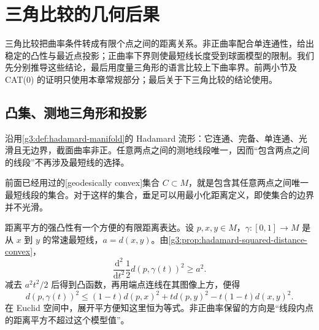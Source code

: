 
% 
% 
% 

\section{三角比较的几何后果}
\label{g3:sec:0904}

三角比较把曲率条件转成有限个点之间的距离关系。非正曲率配合单连通性，给出稳定的凸性与最近点投影；正曲率下界则使最短线长度受到球面模型的限制。我们先分别推导这些结论，最后用度量三角形的语言比较上下曲率界。前两小节及 CAT(0) 的证明只使用本章常规部分；最后关于下三角比较的结论使用。

\subsection{凸集、测地三角形和投影}
\label{g3:subsec:0904:01}

沿用\cref{g3:def:hadamard-manifold}的 Hadamard 流形：它连通、完备、单连通、光滑且无边界，截面曲率非正。任意两点之间的测地线段唯一，因而“包含两点之间的线段”不再涉及最短线的选择。

前面已经用过的[geodesically convex]集合 \(C\subset M\)，就是包含其任意两点之间唯一最短线段的集合。对于这样的集合，垂足可以用最小化距离定义，即使集合的边界并不光滑。

距离平方的强凸性有一个方便的有限距离表达。设 \(p,x,y\in M\)，\(\gamma:[0,1]\to M\) 是从 \(x\) 到 \(y\) 的常速最短线，\(a=d(x,y)\)。由\cref{g3:prop:hadamard-squared-distance-convex}，
\[
	\frac{\mathrm d^2}{\mathrm dt^2}\frac12d(p,\gamma(t))^2
	\ge a^2.
\]
减去 \(a^2t^2/2\) 后得到凸函数，再用端点连线在其图像上方，便得
\begin{equation}\label{g3:eq:hadamard-cn}
	d(p,\gamma(t))^2
	\le(1-t)d(p,x)^2+td(p,y)^2-t(1-t)d(x,y)^2.
\end{equation}
在 Euclid 空间中，展开平方便知这里恒为等式。非正曲率保留的方向是“线段内点的距离平方不超过这个模型值”。

